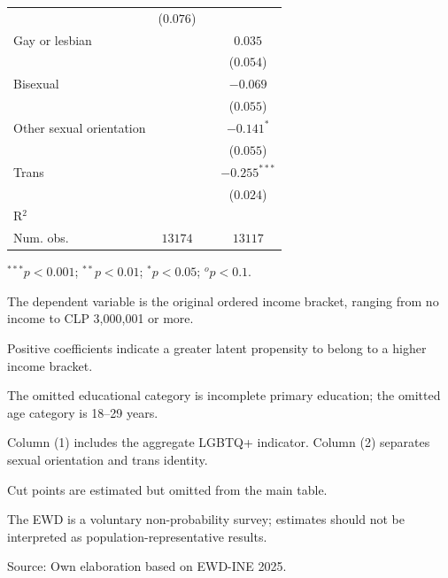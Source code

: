 \begin{table}[H]
\begin{center}
\begin{threeparttable}
\begin{tabular}{lccc}
 & ($0.076$) & &  \\ 
Gay or lesbian &  & & $0.035$ \\ 
 &  & & ($0.054$) \\ 
Bisexual &  & & $-0.069$ \\ 
 &  & & ($0.055$) \\ 
Other sexual orientation &  & & $-0.141^{*}$ \\ 
 &  & & ($0.055$) \\ 
Trans &  & & $-0.255^{***}$ \\ 
 &  & & ($0.024$) \\ 
R$^2$ &  & &  \\ 
Num. obs. & $13174$ & & $13117$ \\ \bottomrule
\end{tabular}
\begin{tablenotes}
\item ${}^{***}p<0.001$; ${}^{**}p<0.01$; ${}^{*}p<0.05$; ${}^{o}p<0.1$.
\item The dependent variable is the original ordered income bracket, ranging from no income to CLP 3,000,001 or more.
\item Positive coefficients indicate a greater latent propensity to belong to a higher income bracket.
\item The omitted educational category is incomplete primary education; the omitted age category is 18--29 years.
\item Column (1) includes the aggregate LGBTQ+ indicator. Column (2) separates sexual orientation and trans identity.
\item Cut points are estimated but omitted from the main table.
\item The EWD is a voluntary non-probability survey; estimates should not be interpreted as population-representative results.
\item Source: Own elaboration based on EWD-INE 2025.
\end{tablenotes}
\end{threeparttable}
\end{center}
\end{table}